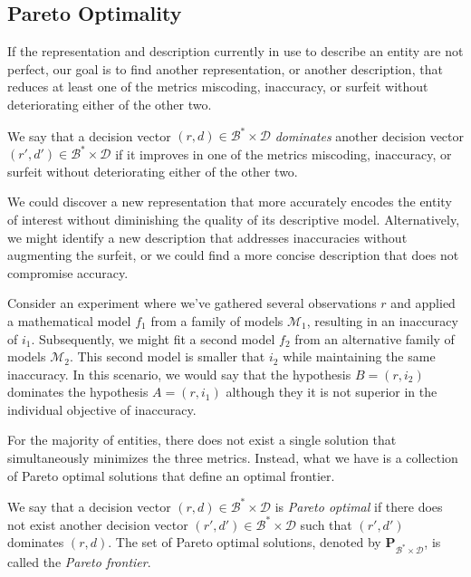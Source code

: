 \subsection*{Pareto Optimality}

If the representation and description currently in use to describe an entity are not perfect, our goal is to find another representation, or another description, that reduces at least one of the metrics miscoding, inaccuracy, or surfeit without deteriorating either of the other two.

\begin{definition}
We say that a decision vector $(r, d) \in \mathcal{B}^\ast \times \mathcal{D}$ \emph{dominates} another decision vector $(r', d') \in \mathcal{B}^\ast \times \mathcal{D}$ if it improves in one of the metrics miscoding, inaccuracy, or surfeit without deteriorating either of the other two.
\end{definition}

We could discover a new representation that more accurately encodes the entity of interest without diminishing the quality of its descriptive model. Alternatively, we might identify a new description that addresses inaccuracies without augmenting the surfeit, or we could find a more concise description that does not compromise accuracy.

\begin{example}
\label{ex:nescience_pareto}
Consider an experiment where we've gathered several observations $r$ and applied a mathematical model $f_1$ from a family of models $\mathcal{M}_1$, resulting in an inaccuracy of $i_1$. Subsequently, we might fit a second model $f_2$ from an alternative family of models $\mathcal{M}_2$. This second model is smaller that $i_2$ while maintaining the same inaccuracy. In this scenario, we would say that the hypothesis $B = (r, i_2)$ dominates the hypothesis $A = (r, i_1)$ although they it is not superior in the individual objective of inaccuracy.
\end{example}

For the majority of entities, there does not exist a single solution that simultaneously minimizes the three metrics. Instead, what we have is a collection of Pareto optimal solutions that define an optimal frontier.

\begin{definition}
We say that a decision vector $(r, d) \in \mathcal{B}^\ast \times \mathcal{D}$ is \emph{Pareto optimal} if there does not exist another decision vector $(r', d') \in \mathcal{B}^\ast \times \mathcal{D}$ such that $(r', d')$ dominates $(r, d)$. The set of Pareto optimal solutions, denoted by $\mathbf{P}_{\mathcal{B}^\ast \times \mathcal{D}}$, is called the \emph{Pareto frontier}.
\end{definition}

